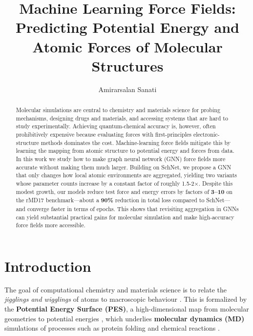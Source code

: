 \documentclass[sigconf, nonacm]{acmart}
\begin{document}
\title{Machine Learning Force Fields: Predicting Potential Energy and Atomic Forces of Molecular Structures}

\author{Amirarsalan Sanati}

\begin{abstract}
	Molecular simulations are central to chemistry and materials science for probing mechanisms, designing drugs and materials, and accessing systems that are hard to study experimentally. Achieving quantum-chemical accuracy is, however, often prohibitively expensive because evaluating forces with first-principles electronic-structure methods dominates the cost. Machine-learning force fields mitigate this by learning the mapping from atomic structure to potential energy and forces from data. In this work we study how to make graph neural network (GNN) force fields more accurate without making them much larger. Building on SchNet, we propose a GNN that only changes how local atomic environments are aggregated, yielding two variants whose parameter counts increase by a constant factor of roughly 1.5-2×. Despite this modest growth, our models reduce test force and energy errors by factors of \textbf{3–10} on the rMD17 benchmark—about a \textbf{90\%} reduction in total loss compared to SchNet—and converge faster in terms of epochs. This shows that revisiting aggregation in GNNs can yield substantial practical gains for molecular simulation and make high-accuracy force fields more accessible.
\end{abstract}

\maketitle

\section{Introduction}

The goal of computational chemistry and materials science is to relate the \textit{jigglings and wigglings} of atoms to macroscopic behaviour \cite{MlffAlex, frank2022so3krates}. This is formalized by the \textbf{Potential Energy Surface (PES)}, a high-dimensional map from molecular geometries to potential energies \cite{MlffAlex}, which underlies \textbf{molecular dynamics (MD)} simulations of processes such as protein folding and chemical reactions \cite{CUI2025103191, Schtt2021EquivariantMP}.
\end{document}
